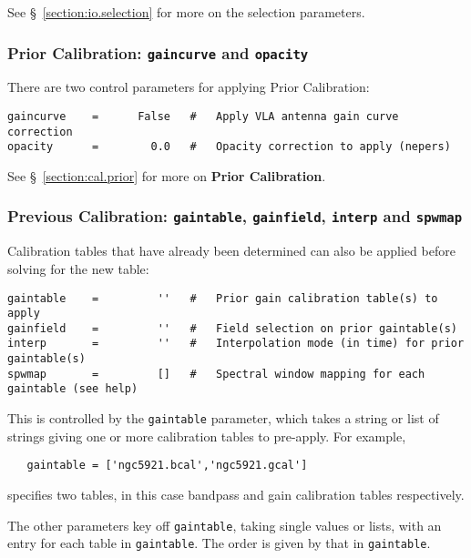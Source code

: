 See \S~\ref{section:io.selection} for more on the selection parameters.

\subsubsection{Prior Calibration: {\tt gaincurve} and
   {\tt opacity} }
\label{section:cal.solve.pars.prior}

There are two control parameters for applying Prior Calibration:
\small
\begin{verbatim}
gaincurve    =      False   #   Apply VLA antenna gain curve correction
opacity      =        0.0   #   Opacity correction to apply (nepers)
\end{verbatim}
\normalsize

See \S~\ref{section:cal.prior} for more on {\bf Prior Calibration}.

\subsubsection{Previous Calibration: {\tt gaintable},
{\tt gainfield}, {\tt interp} and {\tt spwmap} }
\label{section:cal.solve.pars.previous}

Calibration tables that have already been determined can also be
applied before solving for the new table:
\small
\begin{verbatim}
gaintable    =         ''   #   Prior gain calibration table(s) to apply
gainfield    =         ''   #   Field selection on prior gaintable(s)
interp       =         ''   #   Interpolation mode (in time) for prior gaintable(s)
spwmap       =         []   #   Spectral window mapping for each gaintable (see help)
\end{verbatim}
\normalsize

This is controlled by the {\tt gaintable} parameter, which takes 
a string or list of strings giving one or more calibration tables 
to pre-apply.  For example,
\small
\begin{verbatim}
   gaintable = ['ngc5921.bcal','ngc5921.gcal']
\end{verbatim}
\normalsize
specifies two tables, in this case bandpass and gain calibration tables
respectively.

The other parameters key off {\tt gaintable}, taking single values or
lists, with an entry for each table in {\tt gaintable}.  The order is
given by that in {\tt gaintable}.

